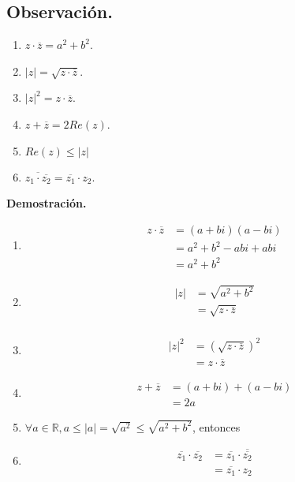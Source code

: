 \documentclass[11pt]{article}
\newcommand{\R}{\mathbb{R}}
\begin{document}

\subsection*{Observación.}

\begin{enumerate}[label=\roman*)]
  \item $z \cdot \overline{z} = a^2+b^2$.
  \item $|z| = \sqrt{z\cdot \overline{z}}$.
  \item $|z|^2 = z \cdot \overline{z}$.
  \item $z+\overline{z} = 2Re(z)$.
  \item $Re(z)\leq |z|$
  \item $\overline{z_1\cdot \overline{z_2}} = \overline{z_1} \cdot z_2$.
\end{enumerate}

\textbf{Demostración.}

\begin{enumerate}[label=\roman*)]
  \item \begin{align*}
    z \cdot \overline{z} &= (a+bi)(a-bi)\\
    &= a^2+b^2-abi+abi\\
    &= a^2+b^2
  \end{align*}
  
  \item \begin{align*}
    |z| &=\sqrt{a^2+b^2} \\
    &= \sqrt{z\cdot \overline{z}}\\
  \end{align*}

  \item \begin{align*}
    |z|^2 &= \left(\sqrt{z \cdot \overline{z}}\right)^2 \\
    &= z \cdot \overline{z}
  \end{align*}

  \item \begin{align*}
    z + \overline{z} &= (a+bi) + (a-bi) \\
    &= 2a
  \end{align*}

  \item $\forall a\in \R, a \leq |a|=\sqrt{a^2} \leq \sqrt{a^2+b^2}$, entonces

  \item \begin{align*} 
    \overline{z_1}\cdot \overline{z_2} &= \overline{z_1} \cdot \overline{\overline{z_2}} \\
    &= \overline{z_1} \cdot z_2
  \end{align*}

\end{enumerate}
\end{document}
